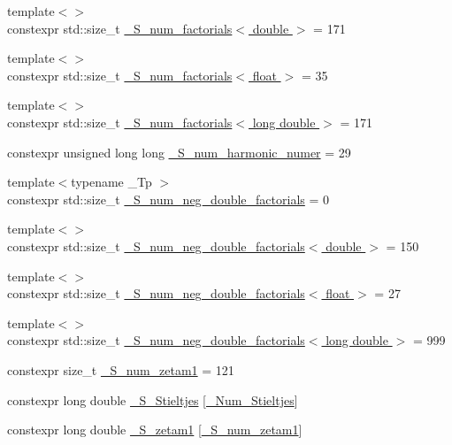 \begin{DoxyCompactItemize}
\item 
{\footnotesize template$<$$>$ }\\constexpr std\+::size\+\_\+t \hyperlink{namespacestd_1_1____detail_ad415b9ec36471d7aca4ebcd22cb7b216}{\+\_\+\+S\+\_\+num\+\_\+factorials$<$ double $>$} = 171
\item 
{\footnotesize template$<$$>$ }\\constexpr std\+::size\+\_\+t \hyperlink{namespacestd_1_1____detail_a3a29651303ca2222246ef6f0a17e92ec}{\+\_\+\+S\+\_\+num\+\_\+factorials$<$ float $>$} = 35
\item 
{\footnotesize template$<$$>$ }\\constexpr std\+::size\+\_\+t \hyperlink{namespacestd_1_1____detail_ab90b8eb39ff963a5ed533a3be0b7f7fd}{\+\_\+\+S\+\_\+num\+\_\+factorials$<$ long double $>$} = 171
\item 
constexpr unsigned long long \hyperlink{namespacestd_1_1____detail_a554788747841f6abbfd7572673df32ad}{\+\_\+\+S\+\_\+num\+\_\+harmonic\+\_\+numer} = 29
\item 
{\footnotesize template$<$typename \+\_\+\+Tp $>$ }\\constexpr std\+::size\+\_\+t \hyperlink{namespacestd_1_1____detail_ac386f200e589ce1fc895c2aac0e47f8c}{\+\_\+\+S\+\_\+num\+\_\+neg\+\_\+double\+\_\+factorials} = 0
\item 
{\footnotesize template$<$$>$ }\\constexpr std\+::size\+\_\+t \hyperlink{namespacestd_1_1____detail_a2d14a1207a6fea22f32586dfd41cf49d}{\+\_\+\+S\+\_\+num\+\_\+neg\+\_\+double\+\_\+factorials$<$ double $>$} = 150
\item 
{\footnotesize template$<$$>$ }\\constexpr std\+::size\+\_\+t \hyperlink{namespacestd_1_1____detail_a3ce62e66e9a196fd89b4d841f7374d68}{\+\_\+\+S\+\_\+num\+\_\+neg\+\_\+double\+\_\+factorials$<$ float $>$} = 27
\item 
{\footnotesize template$<$$>$ }\\constexpr std\+::size\+\_\+t \hyperlink{namespacestd_1_1____detail_a2ef051ec96e521e71489d2327d11c22a}{\+\_\+\+S\+\_\+num\+\_\+neg\+\_\+double\+\_\+factorials$<$ long double $>$} = 999
\item 
constexpr size\+\_\+t \hyperlink{namespacestd_1_1____detail_a807e36c2aec3a9f27fdb21726cd464e2}{\+\_\+\+S\+\_\+num\+\_\+zetam1} = 121
\item 
constexpr long double \hyperlink{namespacestd_1_1____detail_acc0b5ea5ffcc30a404893f434f17a865}{\+\_\+\+S\+\_\+\+Stieltjes} \mbox{[}\hyperlink{namespacestd_1_1____detail_a20c3b4334b0ffa9a5da21768d7830894}{\+\_\+\+Num\+\_\+\+Stieltjes}\mbox{]}
\item 
constexpr long double \hyperlink{namespacestd_1_1____detail_a22ed80d9e5c3bc79e61a3cdb8e79a462}{\+\_\+\+S\+\_\+zetam1} \mbox{[}\hyperlink{namespacestd_1_1____detail_a807e36c2aec3a9f27fdb21726cd464e2}{\+\_\+\+S\+\_\+num\+\_\+zetam1}\mbox{]}
\end{DoxyCompactItemize}


